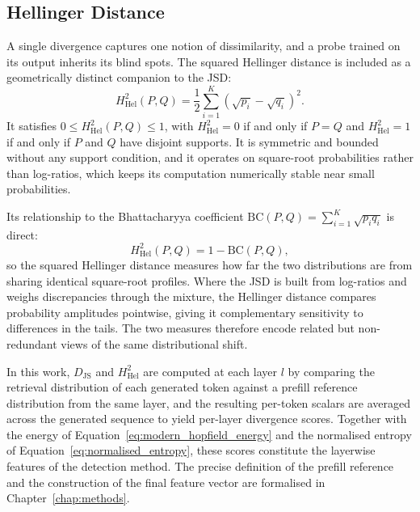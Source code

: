 \subsection{Hellinger Distance}
\label{subsec:hellinger}

A single divergence captures one notion of dissimilarity, and a probe trained
on its output inherits its blind spots. The squared Hellinger distance
\citep{hellinger1909neue} is included as a geometrically distinct companion
to the JSD:
\begin{equation}
    H^2_{\mathrm{Hel}}(P, Q)
    =
    \frac{1}{2}\sum_{i=1}^{K}
    \!\left(\sqrt{p_i} - \sqrt{q_i}\right)^{\!2}.
    \label{eq:hellinger_squared}
\end{equation}
It satisfies $0 \leq H^2_{\mathrm{Hel}}(P, Q) \leq 1$, with
$H^2_{\mathrm{Hel}} = 0$ if and only if $P = Q$ and
$H^2_{\mathrm{Hel}} = 1$ if and only if $P$ and $Q$ have disjoint supports.
It is symmetric and bounded without any support condition, and it operates on
square-root probabilities rather than log-ratios, which keeps its computation
numerically stable near small probabilities.

Its relationship to the Bhattacharyya coefficient
$\mathrm{BC}(P, Q) = \sum_{i=1}^{K} \sqrt{p_i q_i}$ is direct:
\begin{equation}
    H^2_{\mathrm{Hel}}(P, Q) = 1 - \mathrm{BC}(P, Q),
    \label{eq:hellinger_bhattacharyya}
\end{equation}
so the squared Hellinger distance measures how far the two distributions are
from sharing identical square-root profiles. Where the JSD is built from
log-ratios and weighs discrepancies through the mixture, the Hellinger
distance compares probability amplitudes pointwise, giving it complementary
sensitivity to differences in the tails. The two measures therefore encode
related but non-redundant views of the same distributional shift.

In this work, $D_{\mathrm{JS}}$ and $H^2_{\mathrm{Hel}}$ are computed at each
layer $l$ by comparing the retrieval distribution of each generated token
against a prefill reference distribution from the same layer, and the
resulting per-token scalars are averaged across the generated sequence to
yield per-layer divergence scores. Together with the energy of
Equation~\eqref{eq:modern_hopfield_energy} and the normalised entropy of
Equation~\eqref{eq:normalised_entropy}, these scores constitute the layerwise
features of the detection method. The precise definition of the prefill
reference and the construction of the final feature vector are formalised in
Chapter~\ref{chap:methods}.
